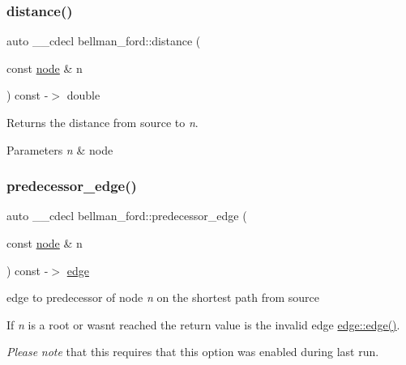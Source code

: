 \subsubsection{\texorpdfstring{distance()}{distance()}}
{\footnotesize\ttfamily auto \+\_\+\+\_\+cdecl bellman\+\_\+ford\+::distance (\begin{DoxyParamCaption}\item[{const \mbox{\hyperlink{classnode}{node}} \&}]{n }\end{DoxyParamCaption}) const -\/$>$ double \hspace{0.3cm}{\ttfamily [inline]}}



Returns the distance from source to {\itshape n}. 


\begin{DoxyParams}{Parameters}
{\em n} & node \\
\hline
\end{DoxyParams}
\mbox{\label{classbellman__ford_a367c6fa92aaf08ddbc4c9545eabf6518}} 
\subsubsection{\texorpdfstring{predecessor\+\_\+edge()}{predecessor\_edge()}}
{\footnotesize\ttfamily auto \+\_\+\+\_\+cdecl bellman\+\_\+ford\+::predecessor\+\_\+edge (\begin{DoxyParamCaption}\item[{const \mbox{\hyperlink{classnode}{node}} \&}]{n }\end{DoxyParamCaption}) const -\/$>$ \mbox{\hyperlink{classedge}{edge}}
	\hspace{0.3cm}{\ttfamily [inline]}}



edge to predecessor of node {\itshape n} on the shortest path from source 

If {\itshape n} is a root or wasn\textquotesingle{}t reached the return value is the invalid edge \mbox{\hyperlink{classedge_a41859d2473a15e24255d7bc0de1f49b4}{edge\+::edge()}}.

{\itshape Please} {\itshape note} that this requires that this option was enabled during last run.


